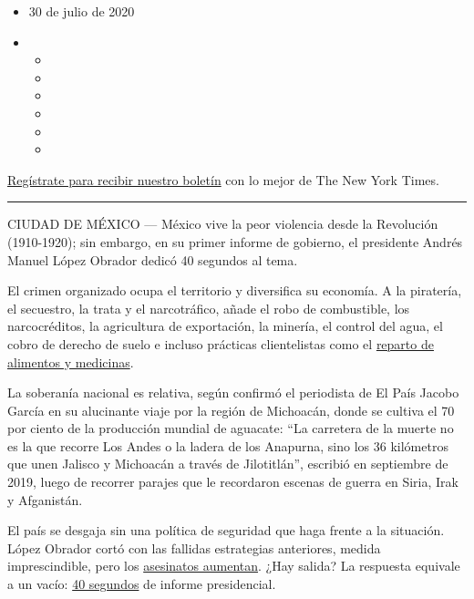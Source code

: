 \begin{itemize}
\item
  30 de julio de 2020
\item
  \begin{itemize}
  \item
  \item
  \item
  \item
  \item
  \item
  \end{itemize}
\end{itemize}

\href{https://www.nytimes.com/newsletters/el-times}{Regístrate para
recibir nuestro boletín} con lo mejor de The New York Times.

\begin{center}\rule{0.5\linewidth}{\linethickness}\end{center}

CIUDAD DE MÉXICO --- México vive la peor violencia desde la Revolución
(1910-1920); sin embargo, en su primer informe de gobierno, el
presidente Andrés Manuel López Obrador dedicó 40 segundos al tema.

El crimen organizado ocupa el territorio y diversifica su economía. A la
piratería, el secuestro, la trata y el narcotráfico, añade el robo de
combustible, los narcocréditos, la agricultura de exportación, la
minería, el control del agua, el cobro de derecho de suelo e incluso
prácticas clientelistas como el
\href{https://www.nytimes.com/es/2020/07/07/espanol/opinion/coronavirus-carteles-drogas-mexico.html}{reparto
de alimentos y medicinas}.

La soberanía nacional es relativa, según confirmó el periodista de El
País Jacobo García en su alucinante viaje por la región de Michoacán,
donde se cultiva el 70 por ciento de la producción mundial de aguacate:
``La carretera de la muerte no es la que recorre Los Andes o la ladera
de los Anapurna, sino los 36 kilómetros que unen Jalisco y Michoacán a
través de Jilotitlán'', escribió en septiembre de 2019, luego de
recorrer parajes que le recordaron escenas de guerra en Siria, Irak y
Afganistán.

El país se desgaja sin una política de seguridad que haga frente a la
situación. López Obrador cortó con las fallidas estrategias anteriores,
medida imprescindible, pero los
\href{https://www.gob.mx/sesnsp/acciones-y-programas/victimas-nueva-metodologia?state=published}{asesinatos
aumentan}. ¿Hay salida? La respuesta equivale a un vacío:
\href{https://elpais.com/internacional/2019/10/19/actualidad/1571506100_833972.html}{40
segundos} de informe presidencial.

